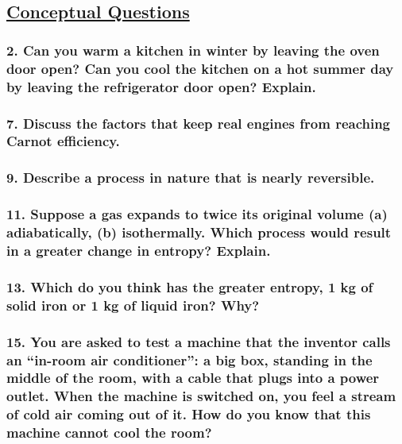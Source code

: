 \documentclass{article}
\title{
    \vspace{2in}
    \textmd{\textbf{\hmwkTitle}}\\
    \vspace{0.5in}
    \textmd{\textbf{\hmwkClass}}\\
    \vspace{4in}
}
\author{\hmwkAuthorName}
\date{}
\begin{document}
\maketitle
\newpage
\begin{center}
    \section*{\textbf{\underline {Conceptual Questions}}}
\end{center}
\subsubsection*{
    2. Can you warm a kitchen in winter by leaving the oven door
    open? Can you cool the kitchen on a hot summer day by
    leaving the refrigerator door open? Explain.
}
\vspace{2.5in}
\subsubsection*{
    7. Discuss the factors that keep real engines from
    reaching Carnot efficiency.
}
\vspace{2.5in}
\subsubsection*{
    9. Describe a process in nature that is nearly reversible.
}
\newpage
\subsubsection*{
    11. Suppose a gas expands to twice its original volume 
    (\textbf{a}) adiabatically, (\textbf{b}) isothermally. 
    Which process would result in a greater change in entropy? Explain.
}
\vspace{2.5in}
\subsubsection*{
    13. Which do you think has the greater entropy, 
    1 kg of solid iron or 1 kg of liquid iron? Why?
}
\vspace{2in}
\subsubsection*{
    15. You are asked to test a machine that the inventor
    calls an “in-room air conditioner”: a big box, standing 
    in the middle of the room, with a cable that plugs into a
    power outlet. When the machine is switched on, you feel a
    stream of cold air coming out of it. How do you know that this machine cannot cool the room?
}
\newpage
\end{document}
